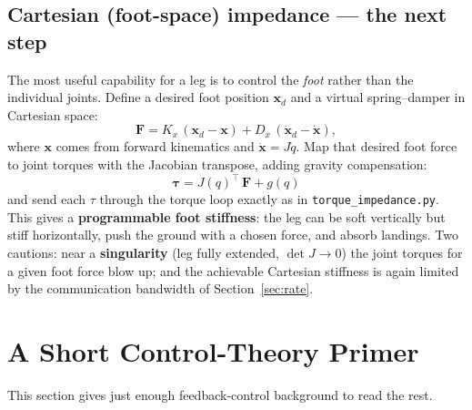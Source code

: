 \documentclass[11pt,a4paper]{article}
\newcommand{\code}[1]{\texttt{#1}}
\begin{document}
\subsection{Cartesian (foot-space) impedance --- the next step}
The most useful capability for a leg is to control the \emph{foot} rather than
the individual joints. Define a desired foot position $\mathbf x_d$ and a virtual
spring--damper in Cartesian space:
\begin{equation}
  \mathbf F = K_x\,(\mathbf x_d - \mathbf x) + D_x\,(\dot{\mathbf x}_d - \dot{\mathbf x}),
\end{equation}
where $\mathbf x$ comes from forward kinematics and $\dot{\mathbf x}=J\dot q$.
Map that desired foot force to joint torques with the Jacobian transpose, adding
gravity compensation:
\begin{equation}
  \boxed{\;\boldsymbol\tau = J(q)^{\!\top}\,\mathbf F + g(q)\;}
\end{equation}
and send each $\tau$ through the torque loop exactly as in
\code{torque\_impedance.py}. This gives a \textbf{programmable foot stiffness}:
the leg can be soft vertically but stiff horizontally, push the ground with a
chosen force, and absorb landings. Two cautions: near a \textbf{singularity}
(leg fully extended, $\det J \to 0$) the joint torques for a given foot force
blow up; and the achievable Cartesian stiffness is again limited by the
communication bandwidth of Section~\ref{sec:rate}.

\section{A Short Control-Theory Primer}

This section gives just enough feedback-control background to read the rest.
\end{document}
